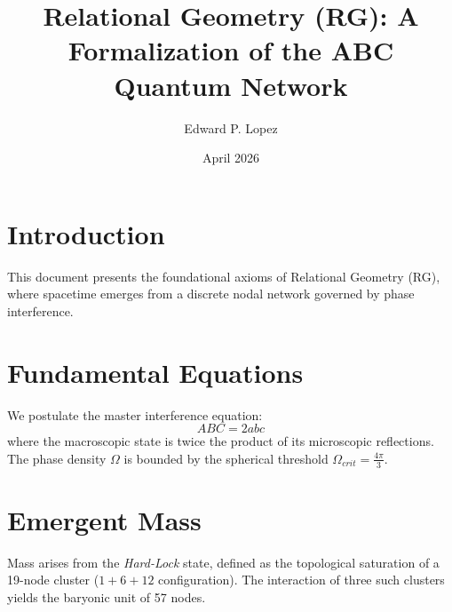 \documentclass{article}
\title{Relational Geometry (RG): A Formalization of the ABC Quantum Network}
\author{Edward P. Lopez}
\date{April 2026}
\begin{document}
\maketitle

\section{Introduction}
This document presents the foundational axioms of Relational Geometry (RG), where spacetime emerges from a discrete nodal network governed by phase interference.

\section{Fundamental Equations}
We postulate the master interference equation:
\[ ABC = 2abc \]
where the macroscopic state is twice the product of its microscopic reflections. The phase density $\Omega$ is bounded by the spherical threshold $\Omega_{crit} = \frac{4\pi}{3}$.

\section{Emergent Mass}
Mass arises from the \textit{Hard-Lock} state, defined as the topological saturation of a 19-node cluster ($1+6+12$ configuration). The interaction of three such clusters yields the baryonic unit of 57 nodes.
\end{document}
